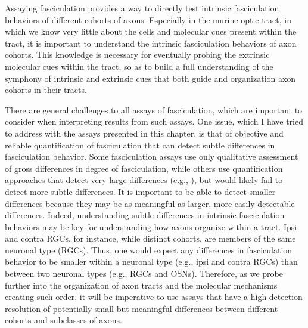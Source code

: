 Assaying fasciculation \invitro{} provides a way to directly test intrinsic fasciculation behaviors of different cohorts of axons.
Especially in the murine optic tract, in which we know very little about the cells and molecular cues present within the tract, it is important to understand the intrinsic fasciculation behaviors of axon cohorts.
This knowledge is necessary for eventually probing the extrinsic molecular cues within the tract, so as to build a full understanding of the symphony of intrinsic and extrinsic cues that both guide and organization axon cohorts in their tracts.

There are general challenges to all \invitro{} assays of fasciculation, which are important to consider when interpreting results from such assays.
One issue, which I have tried to address with the assays presented in this chapter, is that of objective and reliable quantification of fasciculation that can detect subtle differences in fasciculation behavior.
Some fasciculation assays use only qualitative assessment of gross differences in degree of fasciculation, while others use quantification approaches that detect very large differences (e.g., ), but would likely fail to detect more subtle differences.
It is important to be able to detect smaller differences because they may be as meaningful as larger, more easily detectable differences.
Indeed, understanding subtle differences in intrinsic fasciculation behaviors may be key for understanding how axons organize within a tract.
Ipsi and contra RGCs, for instance, while distinct cohorts, are members of the same neuronal type (RGCs). 
Thus, one would expect any differences in fasciculation behavior to be smaller within a neuronal type (e.g., ipsi and contra RGCs) than between two neuronal types (e.g., RGCs and OSNs).
Therefore, as we probe further into the organization of axon tracts and the molecular mechanisms creating such order, it will be imperative to use assays that have a high detection resolution of potentially small but meaningful differences between different cohorts and subclasses of axons.

